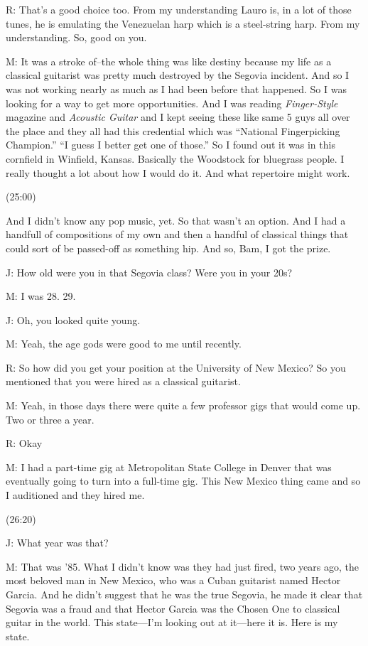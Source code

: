 \documentclass[11pt]{article}
\begin{document}
R: That's a good choice too. From my understanding Lauro is, in a lot of those tunes, he is emulating the Venezuelan harp which is a steel-string harp. From my understanding. So, good on you. 

M: It was a stroke of–the whole thing was like destiny because my life as a classical guitarist was pretty much destroyed by the Segovia incident. And so I was not working nearly as much as I had been before that happened. So I was looking for a way to get more opportunities. And I was reading \emph{Finger-Style} magazine and \emph{Acoustic Guitar} and I kept seeing these like same 5 guys all over the place and they all had this credential which was ``National Fingerpicking Champion.'' ``I guess I better get one of those.'' So I found out it was in this cornfield in Winfield, Kansas. Basically the Woodstock for bluegrass people. I really thought a lot about how I would do it. And what repertoire might work.

(25:00)

And I didn't know any pop music, yet. So that wasn't an option. And I had a handfull of compositions of my own and then a handful of classical things that could sort of be passed-off as something hip. And so, Bam, I got the prize. 

J: How old were you in that Segovia class? Were you in your 20s?

M: I was 28. 29.

J: Oh, you looked quite young. 

M: Yeah, the age gods were good to me until recently. 

R: So how did you get your position at the University of New Mexico? So you mentioned that you were hired as a classical guitarist. 

M: Yeah, in those days there were quite a few professor gigs that would come up. Two or three a year.  

R: Okay

M: I had a part-time gig at Metropolitan State College in Denver that was eventually going to turn into a full-time gig. This New Mexico thing came and so I auditioned and they hired me. 

(26:20)

J: What year was that?

M: That was '85. What I didn't know was they had just fired, two years ago, the most beloved man in New Mexico, who was a Cuban guitarist named Hector Garcia. And he didn't suggest that he was the true Segovia, he made it clear that Segovia was a fraud and that Hector Garcia was the Chosen One to classical guitar in the world.  This state—I'm looking out at it—here it is. Here is my state.
\end{document}
